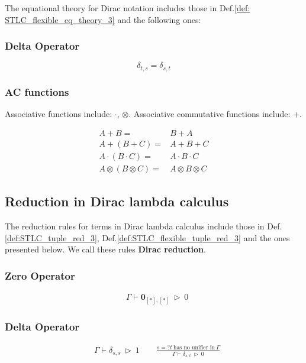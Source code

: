 The equational theory for Dirac notation includes those in Def.\ref{def: STLC_flexible_eq_theory_3} and the following ones:

\subsubsection*{Delta Operator}
$$
    \delta_{t, s} = \delta_{s, t}
$$

\subsubsection*{AC functions}

Associative functions include: $\cdot$, $\otimes$. 
Associative commutative functions include: $+$.

\begin{align*}
    A + B = & B + A \\
    A + (B + C) = & A + B + C \\
    A \cdot (B \cdot C) = & A \cdot B \cdot C \\
    A \otimes (B \otimes C) = & A \otimes B \otimes C
\end{align*}



\subsection{Reduction in Dirac lambda calculus}
\label{subsec:Dirac reduction_3}
The reduction rules for terms in Dirac lambda calculus include those in Def.\ref{def:STLC_tuple_red_3}, Def.\ref{def:STLC_flexible_tuple_red_3} and the ones presented below.
We call these rules \textbf{Dirac reduction}.


\subsubsection*{Zero Operator}
\begin{align*}
  & \Gamma \vdash \mathbf{0}_{[*], [*]} \ \triangleright\ 0
\end{align*}


\subsubsection*{Delta Operator}
\begin{align*}
  & \Gamma \vdash \delta_{s, s}\ \triangleright\ 1
  \qquad
  \frac{s =? t\ \textrm{has no unifier in}\ \Gamma}{\Gamma \vdash \delta_{s, t} \ \triangleright\ 0}
\end{align*}

